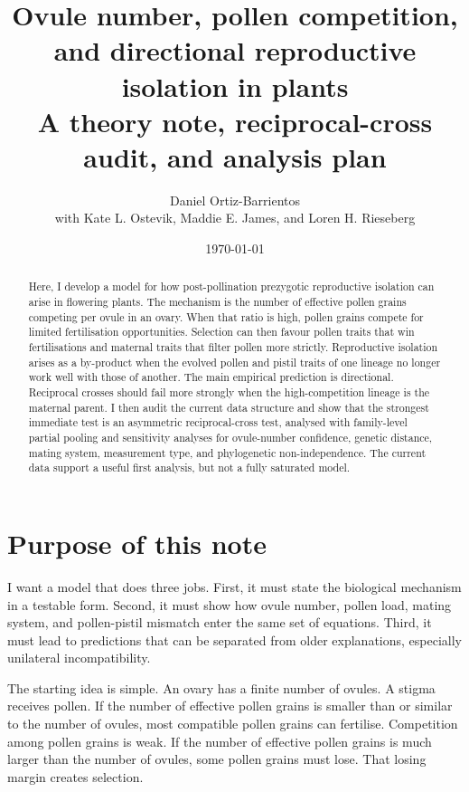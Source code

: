 \documentclass[12pt]{article}
\title{Ovule number, pollen competition, and directional reproductive isolation in plants\\[4pt]{\large A theory note, reciprocal-cross audit, and analysis plan}}
\author{Daniel Ortiz-Barrientos\\[3pt]{\normalsize with Kate L. Ostevik, Maddie E. James, and Loren H. Rieseberg}}
\date{\today}
\begin{document}
\maketitle

\begin{abstract}
Here, I develop a model for how post-pollination prezygotic reproductive isolation can arise in flowering plants. The mechanism is the number of effective pollen grains competing per ovule in an ovary. When that ratio is high, pollen grains compete for limited fertilisation opportunities. Selection can then favour pollen traits that win fertilisations and maternal traits that filter pollen more strictly. Reproductive isolation arises as a by-product when the evolved pollen and pistil traits of one lineage no longer work well with those of another. The main empirical prediction is directional. Reciprocal crosses should fail more strongly when the high-competition lineage is the maternal parent. I then audit the current data structure and show that the strongest immediate test is an asymmetric reciprocal-cross test, analysed with family-level partial pooling and sensitivity analyses for ovule-number confidence, genetic distance, mating system, measurement type, and phylogenetic non-independence. The current data support a useful first analysis, but not a fully saturated model.
\end{abstract}

\tableofcontents
\newpage

\section{Purpose of this note}

I want a model that does three jobs. First, it must state the biological mechanism in a testable form. Second, it must show how ovule number, pollen load, mating system, and pollen-pistil mismatch enter the same set of equations. Third, it must lead to predictions that can be separated from older explanations, especially unilateral incompatibility.

The starting idea is simple. An ovary has a finite number of ovules. A stigma receives pollen. If the number of effective pollen grains is smaller than or similar to the number of ovules, most compatible pollen grains can fertilise. Competition among pollen grains is weak. If the number of effective pollen grains is much larger than the number of ovules, some pollen grains must lose. That losing margin creates selection.
\end{document}
